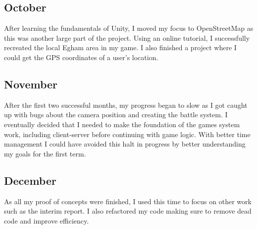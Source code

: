 \documentclass[a4paper]{report}
\begin{document}
\subsection{October}
After learning the fundamentals of Unity, I moved my focus to OpenStreetMap as this was another large part of the project. Using an online tutorial, I successfully recreated the local Egham area in my game. I also finished a project where I could get the GPS coordinates of a user’s location.
\subsection{November}
After the first two successful months, my progress began to slow as I got caught up with bugs about the camera position and creating the battle system. I eventually decided that I needed to make the foundation of the games system work, including client-server before continuing with game logic. With better time management I could have avoided this halt in progress by better understanding my goals for the first term.
\subsection{December}
As all my proof of concepts were finished, I used this time to focus on other work such as the interim report. I also refactored my code making sure to remove dead code and improve efficiency.


\end{document}
